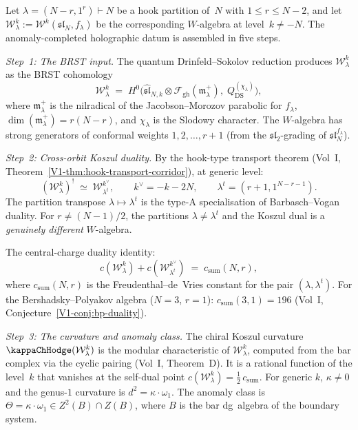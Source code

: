 \begin{construction}
Let $\lambda=(N{-}r,1^r)\vdash N$ be a hook partition of~$N$
with $1\le r\le N{-}2$, and let $\mathcal W_\lambda^k
:= \mathcal W^k(\mathfrak{sl}_N,f_\lambda)$ be the corresponding
$W$-algebra at level~$k\neq -N$. The anomaly-completed
holographic datum is assembled in five steps.

\emph{Step~1: The BRST input.}
The quantum Drinfeld--Sokolov reduction produces
$\mathcal W_\lambda^k$ as the BRST cohomology
\[
\mathcal W_\lambda^k
\;=\;
H^0\!\bigl(
\widehat{\mathfrak{sl}}_{N,k}
\otimes
\mathcal F_{\mathrm{gh}}(\mathfrak m^+_\lambda),\;
Q_{\mathrm{DS}}^{(\chi_\lambda)}
\bigr),
\]
where $\mathfrak m^+_\lambda$ is the nilradical of the
Jacobson--Morozov parabolic for $f_\lambda$,
$\dim(\mathfrak m^+_\lambda)=r(N{-}r)$, and $\chi_\lambda$
is the Slodowy character. The $W$-algebra has strong generators
of conformal weights $1,2,\dots,r{+}1$ (from the
$\mathfrak{sl}_2$-grading of
$\mathfrak{sl}_N^{f_\lambda}$).

\emph{Step~2: Cross-orbit Koszul duality.}
By the hook-type transport theorem
(Vol~I, Theorem~\ref*{V1-thm:hook-transport-corridor}),
at generic level:
\begin{equation}%
(\mathcal W_\lambda^k)^!
\;\simeq\;
\mathcal W_{\lambda^t}^{k^\vee},
\qquad
k^\vee=-k-2N,
\qquad
\lambda^t=(r{+}1,1^{N{-}r{-}1}).
\end{equation}
The partition transpose $\lambda\mapsto\lambda^t$ is the type-A
specialisation of Barbasch--Vogan duality. For $r\neq(N{-}1)/2$,
the partitions $\lambda\neq\lambda^t$ and the Koszul dual is a
\emph{genuinely different} $W$-algebra.

The central-charge duality identity:
\begin{equation}%
c(\mathcal W_\lambda^k)
+c(\mathcal W_{\lambda^t}^{k^\vee})
\;=\;
c_{\mathrm{sum}}(N,r),
\end{equation}
where $c_{\mathrm{sum}}(N,r)$ is the Freudenthal--de~Vries
constant for the pair $(\lambda,\lambda^t)$. For the
Bershadsky--Polyakov algebra ($N=3$, $r=1$):
$c_{\mathrm{sum}}(3,1)=196$
(Vol~I, Conjecture~\ref*{V1-conj:bp-duality}).

\emph{Step~3: The curvature and anomaly class.}
The chiral Koszul curvature $\kappaChHodge(\mathcal W_\lambda^k)$ is
the modular characteristic of $\mathcal W_\lambda^k$,
computed from the bar complex via the cyclic pairing
(Vol~I, Theorem~D). It is a rational function of the
level~$k$ that vanishes at the self-dual point
$c(\mathcal W_\lambda^k)=\tfrac{1}{2}\,c_{\mathrm{sum}}$.
For generic $k$,
$\kappa\neq 0$ and the genus-$1$ curvature is
$d^2=\kappa\cdot\omega_1$. The anomaly class is
$\Theta=\kappa\cdot\omega_1\in Z^2(B)\cap Z(B)$, where $B$
is the bar dg~algebra of the boundary system.


\end{construction}
